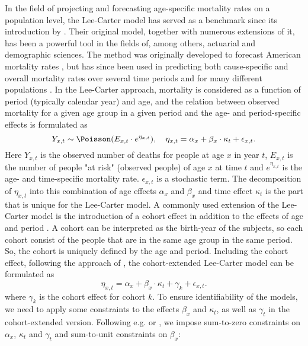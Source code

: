 In the field of projecting and forecasting age-specific mortality rates on a population level, the Lee-Carter model has served as a benchmark since its introduction by \textcite{LeeCarter1992}. Their original model, together with numerous extensions of it, has been a powerful tool in the fields of, among others, actuarial and demographic sciences\cite{booth_tickle_2008}. The method was originally developed to forecast American mortality rates \cite{LeeCarter1992}, but has since been used in predicting both cause-specific and overall mortality rates over several time periods and for many different populations \cite{GirosiKing2007}. 
\newline
\noindent In the Lee-Carter approach, mortality is considered as a function of period (typically calendar year) and age, and the relation between observed mortality for a given age group in a given period and the age- and period-specific effects is formulated as 
\begin{equation}
Y_{x,t} \sim \Poisson(E_{x,t}\cdot e^{\eta_{x,t}}), \quad \eta_{x,t}= \alpha_x + \beta_x\cdot\kappa_t + \epsilon_{x,t}.
\label{eq:LC-model}
\end{equation}
Here $Y_{x,t}$ is the observed number of deaths for people at age $x$ in year $t$, $E_{x,t}$ is the number of people "at risk" (observed people) of age $x$ at time $t$ and $e^{\eta_{x,t}}$ is the age- and time-specific mortality rate. $\epsilon_{x,t}$ is a stochastic term. The decomposition of $\eta_{x,t}$ into this combination of age effects $\alpha_x$ and $\beta_x$ and time effect $\kappa_t$ is the part that is unique for the Lee-Carter model.
\newline
\noindent A commonly used extension of the Lee-Carter model is the introduction of a cohort effect in addition to the effects of age and period \cite{Wisniowski2015}. A cohort can be interpreted as the birth-year of the subjects, so each cohort consist of the people that are in the same age group in the same period. So, the cohort is uniquely defined by the age and period. Including the cohort effect, following the approach of \citet{Wisniowski2015}, the cohort-extended Lee-Carter model can be formulated as
\begin{equation}
    \eta_{x,t} = \alpha_x + \beta_x \cdot \kappa_t + \gamma_k + \epsilon_{x,t}.
    \label{eq:LCC-model}
\end{equation}
where $\gamma_k$ is the cohort effect for cohort $k$. 
To ensure identifiability of the models, we need to apply some constraints to the effects $\beta_x$ and $\kappa_t$, as well as $\gamma_t$ in the cohort-extended version. Following e.g. \citet{Wisniowski2015} or \citet{LeeCarter1992}, we impose sum-to-zero constraints on $\alpha_x$, $\kappa_t$ and $\gamma_t$ and sum-to-unit constraints on $\beta_x$:
